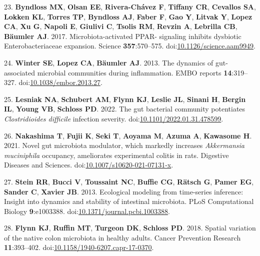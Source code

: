 \documentclass[
  12pt,
]{article}
\newenvironment{cslreferences}%
  {}%
  {\par}
\begin{document}
\begin{cslreferences}
\leavevmode\hypertarget{ref-Byndloss2017}{}%
23. \textbf{Byndloss MX}, \textbf{Olsan EE}, \textbf{Rivera-Chávez F},
\textbf{Tiffany CR}, \textbf{Cevallos SA}, \textbf{Lokken KL},
\textbf{Torres TP}, \textbf{Byndloss AJ}, \textbf{Faber F}, \textbf{Gao
Y}, \textbf{Litvak Y}, \textbf{Lopez CA}, \textbf{Xu G}, \textbf{Napoli
E}, \textbf{Giulivi C}, \textbf{Tsolis RM}, \textbf{Revzin A},
\textbf{Lebrilla CB}, \textbf{Bäumler AJ}. 2017. Microbiota-activated
PPAR- signaling inhibits dysbiotic Enterobacteriaceae expansion. Science
\textbf{357}:570--575.
doi:\href{https://doi.org/10.1126/science.aam9949}{10.1126/science.aam9949}.

\leavevmode\hypertarget{ref-Winter2013}{}%
24. \textbf{Winter SE}, \textbf{Lopez CA}, \textbf{Bäumler AJ}. 2013.
The dynamics of gut-associated microbial communities during
inflammation. EMBO reports \textbf{14}:319--327.
doi:\href{https://doi.org/10.1038/embor.2013.27}{10.1038/embor.2013.27}.

\leavevmode\hypertarget{ref-Lesniak2022}{}%
25. \textbf{Lesniak NA}, \textbf{Schubert AM}, \textbf{Flynn KJ},
\textbf{Leslie JL}, \textbf{Sinani H}, \textbf{Bergin IL}, \textbf{Young
VB}, \textbf{Schloss PD}. 2022. The gut bacterial community potentiates
\emph{Clostridioides difficile} infection severity.
doi:\href{https://doi.org/10.1101/2022.01.31.478599}{10.1101/2022.01.31.478599}.

\leavevmode\hypertarget{ref-Nakashima2021}{}%
26. \textbf{Nakashima T}, \textbf{Fujii K}, \textbf{Seki T},
\textbf{Aoyama M}, \textbf{Azuma A}, \textbf{Kawasome H}. 2021. Novel
gut microbiota modulator, which markedly increases \emph{Akkermansia
muciniphila} occupancy, ameliorates experimental colitis in rats.
Digestive Diseases and Sciences.
doi:\href{https://doi.org/10.1007/s10620-021-07131-x}{10.1007/s10620-021-07131-x}.

\leavevmode\hypertarget{ref-Stein2013}{}%
27. \textbf{Stein RR}, \textbf{Bucci V}, \textbf{Toussaint NC},
\textbf{Buffie CG}, \textbf{Rätsch G}, \textbf{Pamer EG}, \textbf{Sander
C}, \textbf{Xavier JB}. 2013. Ecological modeling from time-series
inference: Insight into dynamics and stability of intestinal microbiota.
PLoS Computational Biology \textbf{9}:e1003388.
doi:\href{https://doi.org/10.1371/journal.pcbi.1003388}{10.1371/journal.pcbi.1003388}.

\leavevmode\hypertarget{ref-Flynn2018}{}%
28. \textbf{Flynn KJ}, \textbf{Ruffin MT}, \textbf{Turgeon DK},
\textbf{Schloss PD}. 2018. Spatial variation of the native colon
microbiota in healthy adults. Cancer Prevention Research
\textbf{11}:393--402.
doi:\href{https://doi.org/10.1158/1940-6207.capr-17-0370}{10.1158/1940-6207.capr-17-0370}.


\end{cslreferences}
\end{document}
